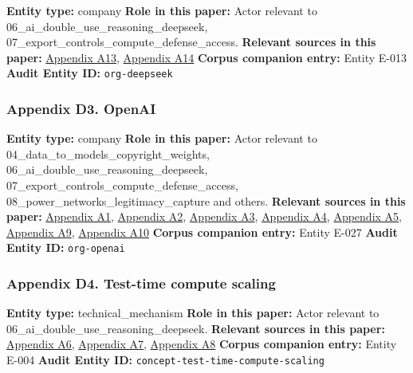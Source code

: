 \documentclass[
  american,
  11pt,
  letterpaper,
]{article}
\begin{document}
\textbf{Entity type:} company \textbf{Role in this paper:} Actor
relevant to 06\_ai\_double\_use\_reasoning\_deepseek,
07\_export\_controls\_compute\_defense\_access. \textbf{Relevant sources
in this paper:}
\hyperref[ch-06-appendix-a13-deepseek-v3-technical-report]{Appendix
A13},
\hyperref[ch-06-appendix-a14-deepseek-r1-incentivizing-reasoning-capability-in-llms-via-reinforcement-learning]{Appendix
A14} \textbf{Corpus companion entry:} Entity E-013 \textbf{Audit Entity
ID:} \texttt{org-deepseek}

\subsubsection{Appendix D3. OpenAI}\label{ch-06-appendix-d3-openai}

\textbf{Entity type:} company \textbf{Role in this paper:} Actor
relevant to 04\_data\_to\_models\_copyright\_weights,
06\_ai\_double\_use\_reasoning\_deepseek,
07\_export\_controls\_compute\_defense\_access,
08\_power\_networks\_legitimacy\_capture and others. \textbf{Relevant
sources in this paper:}
\hyperref[ch-06-appendix-a1-learning-to-reason-with-llms]{Appendix A1},
\hyperref[ch-06-appendix-a2-openai-o1-system-card]{Appendix A2},
\hyperref[ch-06-appendix-a3-openai-acknowledges-new-models-increase-risk-of-misuse-to-create-bioweapons]{Appendix
A3},
\hyperref[ch-06-appendix-a4-openai-researchers-warned-board-of-ai-breakthrough-ahead-of-ceo-ouster-sources-say]{Appendix
A4},
\hyperref[ch-06-appendix-a5-exclusive-openai-working-on-new-reasoning-technology-under-code-name-strawberry]{Appendix
A5},
\hyperref[ch-06-appendix-a9-chatgpt-plans-free-go-plus-pro-business-and-enterprise]{Appendix
A9}, \hyperref[ch-06-appendix-a10-pricing-openai-api]{Appendix A10}
\textbf{Corpus companion entry:} Entity E-027 \textbf{Audit Entity ID:}
\texttt{org-openai}

\subsubsection{Appendix D4. Test-time compute
scaling}\label{ch-06-appendix-d4-test-time-compute-scaling}

\textbf{Entity type:} technical\_mechanism \textbf{Role in this paper:}
Actor relevant to 06\_ai\_double\_use\_reasoning\_deepseek.
\textbf{Relevant sources in this paper:}
\hyperref[ch-06-appendix-a6-scaling-llm-test-time-compute-optimally-can-be-more-effective-than-scaling-model-parameters]{Appendix
A6}, \hyperref[ch-06-appendix-a7-s1-simple-test-time-scaling]{Appendix
A7},
\hyperref[ch-06-appendix-a8-it-s-not-that-simple-an-analysis-of-simple-test-time-scaling]{Appendix
A8} \textbf{Corpus companion entry:} Entity E-004 \textbf{Audit Entity
ID:} \texttt{concept-test-time-compute-scaling}
\end{document}
